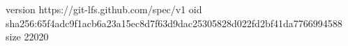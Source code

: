 version https://git-lfs.github.com/spec/v1
oid sha256:65f4adc9f1acb6a23a15ec8d7f63d9dac25305828d022fd2bf41da7766994588
size 22020
